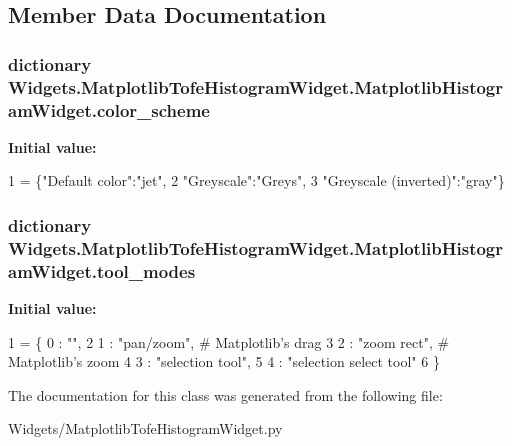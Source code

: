 \subsection{Member Data Documentation}
\hypertarget{classWidgets_1_1MatplotlibTofeHistogramWidget_1_1MatplotlibHistogramWidget_ad26db4a8040143bd1678bb1f41b8c9d8}{
\subsubsection[{color\-\_\-scheme}]{\setlength{\rightskip}{0pt plus 5cm}dictionary Widgets.\-Matplotlib\-Tofe\-Histogram\-Widget.\-Matplotlib\-Histogram\-Widget.\-color\-\_\-scheme\hspace{0.3cm}{\ttfamily [static]}}}\label{classWidgets_1_1MatplotlibTofeHistogramWidget_1_1MatplotlibHistogramWidget_ad26db4a8040143bd1678bb1f41b8c9d8}
{\bfseries Initial value\-:}
\begin{DoxyCode}
1 = \{\textcolor{stringliteral}{"Default color"}:\textcolor{stringliteral}{"jet"},
2                     \textcolor{stringliteral}{"Greyscale"}:\textcolor{stringliteral}{"Greys"},
3                     \textcolor{stringliteral}{"Greyscale (inverted)"}:\textcolor{stringliteral}{"gray"}\}
\end{DoxyCode}
\hypertarget{classWidgets_1_1MatplotlibTofeHistogramWidget_1_1MatplotlibHistogramWidget_a24f1bc714cd9f115d6c9d0f304c6de3c}{
\subsubsection[{tool\-\_\-modes}]{\setlength{\rightskip}{0pt plus 5cm}dictionary Widgets.\-Matplotlib\-Tofe\-Histogram\-Widget.\-Matplotlib\-Histogram\-Widget.\-tool\-\_\-modes\hspace{0.3cm}{\ttfamily [static]}}}\label{classWidgets_1_1MatplotlibTofeHistogramWidget_1_1MatplotlibHistogramWidget_a24f1bc714cd9f115d6c9d0f304c6de3c}
{\bfseries Initial value\-:}
\begin{DoxyCode}
1 = \{ 0 : \textcolor{stringliteral}{""},
2                    1 : \textcolor{stringliteral}{"pan/zoom"},  \textcolor{comment}{# Matplotlib's drag}
3                    2 : \textcolor{stringliteral}{"zoom rect"},  \textcolor{comment}{# Matplotlib's zoom}
4                    3 : \textcolor{stringliteral}{"selection tool"},
5                    4 : \textcolor{stringliteral}{"selection select tool"}
6                   \}
\end{DoxyCode}


The documentation for this class was generated from the following file\-:\begin{DoxyCompactItemize}
\item 
Widgets/Matplotlib\-Tofe\-Histogram\-Widget.\-py\end{DoxyCompactItemize}
